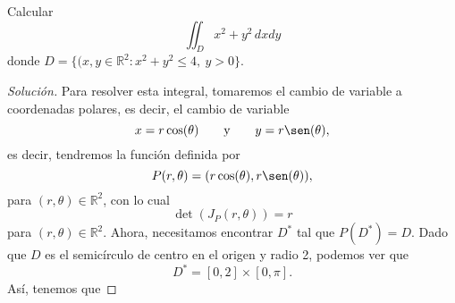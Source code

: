 \documentclass[a4]{aleph-notas}
\begin{document}
\begin{ejer}
    Calcular \[\iint_D x^2+y^2\,dxdy\] donde $D=\{(x,y\in\mathbb{R}^2:x^2+y^2\leq 4,\ y>0\}$.
\end{ejer}

\begin{proof}[Solución]
    Para resolver esta integral, tomaremos el cambio de variable a coordenadas polares, es decir, el cambio de variable
    \[
        x=r\cos(\theta)
        \texty
        y=r\sen(\theta),
    \]
    es decir, tendremos la función definida por
    \[
        P(r,\theta) = (r\cos(\theta) , r\sen(\theta)),
    \]
    para $(r,\theta)\in\mathbb{R}^2$, con lo cual
    \[
        \det(J_P(r,\theta)) = r
    \]
    para $(r,\theta)\in\mathbb{R}^2$. Ahora, necesitamos encontrar $D^*$ tal que $P(D^*)=D$. Dado que $D$ es el semicírculo de centro en el origen y radio 2, podemos ver que
    \[
        D^*=[0,2]\times [0,\pi].
    \]
    Así, tenemos que
\end{proof}
\end{document}
